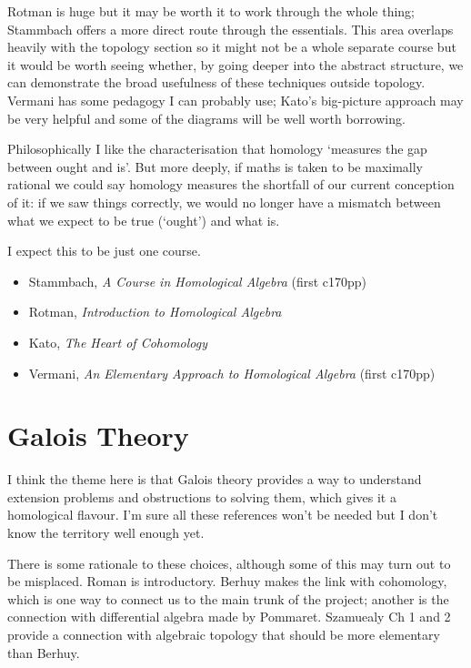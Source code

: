 \documentclass[article]{article}
\begin{document}
Rotman is huge but it may be worth it to work through the whole thing; Stammbach offers a more direct route through the essentials. This area overlaps heavily with the topology section so it might not be a whole separate course but it would be worth seeing whether, by going deeper into the abstract structure, we can demonstrate the broad usefulness of these techniques outside topology. Vermani has some pedagogy I can probably use; Kato's big-picture approach may be very helpful and some of the diagrams will be well worth borrowing.

Philosophically I like the characterisation that homology `measures the gap between ought and is'. But more deeply, if maths is taken to be maximally rational we could say homology measures the shortfall of our current conception of it: if we saw things correctly, we would no longer have a mismatch between what we expect to be true (`ought') and what is.

I expect this to be just one course.

\begin{itemize}
	\item[]{Stammbach, \textit{A Course in Homological Algebra} (first c170pp)}
	\item[]{Rotman, \textit{Introduction to Homological Algebra}}
	\item Kato, \textit{The Heart of Cohomology}
	\item[]{Vermani, \textit{An Elementary Approach to Homological Algebra} (first c170pp)}
\end{itemize}

\section{Galois Theory}

I think the theme here is that Galois theory provides a way to understand extension problems and obstructions to solving them, which gives it a homological flavour. I'm sure all these references won't be needed but I don't know the territory well enough yet.

There is some rationale to these choices, although some of this may turn out to be misplaced. Roman is introductory. Berhuy makes the link with cohomology, which is one way to connect us to the main trunk of the project; another is the connection with differential algebra made by Pommaret. Szamuealy Ch 1 and 2 provide a connection with algebraic topology that should be more elementary than Berhuy.
\end{document}
